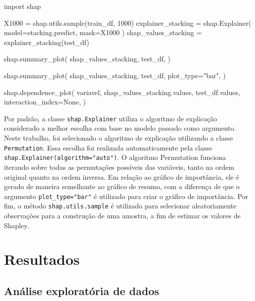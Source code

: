 \documentclass[
  12pt,
  a4paper,
]{scrreprt}
\newenvironment{Shaded}{}{}
\newcommand{\DecValTok}[1]{\textcolor[rgb]{0.00,0.36,0.77}{#1}}
\newcommand{\ImportTok}[1]{\textcolor[rgb]{0.01,0.18,0.38}{#1}}
\newcommand{\NormalTok}[1]{\textcolor[rgb]{0.14,0.16,0.18}{#1}}
\newcommand{\OperatorTok}[1]{\textcolor[rgb]{0.14,0.16,0.18}{#1}}
\newcommand{\StringTok}[1]{\textcolor[rgb]{0.01,0.18,0.38}{#1}}
\newcommand{\VariableTok}[1]{\textcolor[rgb]{0.89,0.38,0.04}{#1}}
\begin{document}
\begin{Shaded}
\begin{Highlighting}[]
\ImportTok{import}\NormalTok{ shap}

\NormalTok{X1000 }\OperatorTok{=}\NormalTok{ shap.utils.sample(train\_df, }\DecValTok{1000}\NormalTok{)}
\NormalTok{explainer\_stacking }\OperatorTok{=}\NormalTok{ shap.Explainer(}
\NormalTok{    model}\OperatorTok{=}\NormalTok{stacking.predict,}
\NormalTok{    mask}\OperatorTok{=}\NormalTok{X1000}
\NormalTok{    )}
\NormalTok{shap\_values\_stacking }\OperatorTok{=}\NormalTok{ explainer\_stacking(test\_df)}

\NormalTok{shap.summary\_plot(}
\NormalTok{    shap\_values\_stacking,}
\NormalTok{    test\_df,}
\NormalTok{    )}

\NormalTok{shap.summary\_plot(}
\NormalTok{    shap\_values\_stacking,}
\NormalTok{    test\_df,}
\NormalTok{    plot\_type}\OperatorTok{=}\StringTok{"bar"}\NormalTok{,}
\NormalTok{    )}

\NormalTok{shap.dependence\_plot(}
\NormalTok{    variavel,}
\NormalTok{    shap\_values\_stacking.values,}
\NormalTok{    test\_df.values,}
\NormalTok{    interaction\_index}\OperatorTok{=}\VariableTok{None}\NormalTok{,}
\NormalTok{    )}
\end{Highlighting}
\end{Shaded}

Por padrão, a classe \texttt{shap.Explainer} utiliza o algoritmo de
explicação considerado a melhor escolha com base no modelo passado como
argumento. Neste trabalho, foi selecionado o algoritmo de explicação
utilizando a classe \texttt{Permutation}. Essa escolha foi realizada
automaticamente pela classe \texttt{shap.Explainer(algorithm="auto")}. O
algoritmo Permutation funciona iterando sobre todas as permutações
possíveis das variáveis, tanto na ordem original quanto na ordem
inversa. Em relação ao gráfico de importância, ele é gerado de maneira
semelhante ao gráfico de resumo, com a diferença de que o argumento
\texttt{plot\_type="bar"} é utilizado para criar o gráfico de
importância. Por fim, o método \texttt{shap.utils.sample} é utilizado
para selecionar aleatoriamente observações para a construção de uma
amostra, a fim de estimar os valores de Shapley.

\chapter{Resultados}\label{resultados}

\section{Análise exploratória de
dados}\label{anuxe1lise-exploratuxf3ria-de-dados-1}
\end{document}
